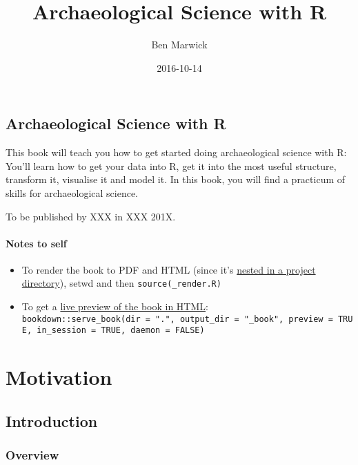 \documentclass[]{book}
\title{Archaeological Science with R}
\author{Ben Marwick}
\date{2016-10-14}
\providecommand{\tightlist}{%
  \setlength{\itemsep}{0pt}\setlength{\parskip}{0pt}}
\begin{document}
\maketitle

{
\setcounter{tocdepth}{1}
\tableofcontents
}
\chapter{Archaeological Science with
R}\label{archaeological-science-with-r}

This book will teach you how to get started doing archaeological science
with R: You'll learn how to get your data into R, get it into the most
useful structure, transform it, visualise it and model it. In this book,
you will find a practicum of skills for archaeological science.

To be published by XXX in XXX 201X.

\subsection{Notes to self}\label{notes-to-self}

\begin{itemize}
\tightlist
\item
  To render the book to PDF and HTML (since it's
  \href{https://github.com/rstudio/bookdown/issues/215}{nested in a
  project directory}), setwd and then
  \texttt{source(\textquotesingle{}\_render.R\textquotesingle{})}\\
\item
  To get a
  \href{https://bookdown.org/yihui/bookdown/serve-the-book.html}{live
  preview of the book in HTML}:
  \texttt{bookdown::serve\_book(dir\ =\ ".",\ output\_dir\ =\ "\_book",\ preview\ =\ TRUE,\ in\_session\ =\ TRUE,\ daemon\ =\ FALSE)}
\end{itemize}

\part{Motivation}\label{part-motivation}


\chapter{Introduction}\label{introduction}

\section{Overview}\label{overview}
\end{document}
